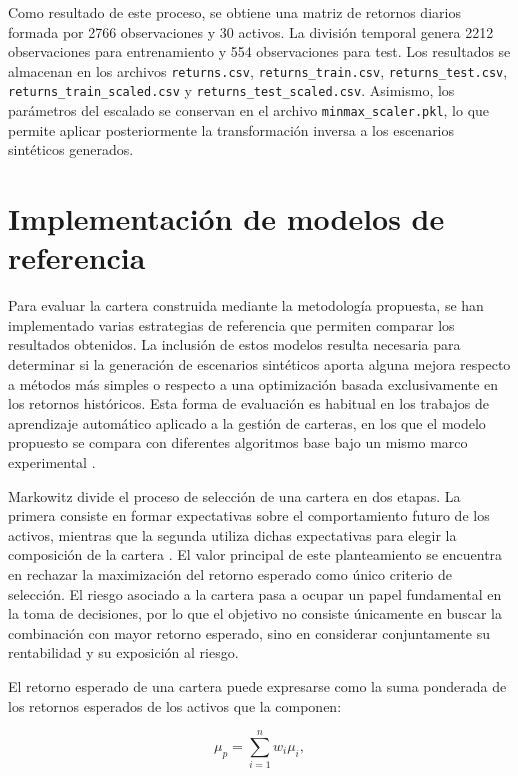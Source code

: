 Como resultado de este proceso, se obtiene una matriz de retornos diarios formada por 2766 observaciones y 30 activos. La división temporal genera 2212 observaciones para entrenamiento y 554 observaciones para test. Los resultados se almacenan en los archivos \texttt{returns.csv}, \texttt{returns\_train.csv}, \texttt{returns\_test.csv}, \texttt{returns\_train\_scaled.csv} y \texttt{returns\_test\_scaled.csv}. Asimismo, los parámetros del escalado se conservan en el archivo \texttt{minmax\_scaler.pkl}, lo que permite aplicar posteriormente la transformación inversa a los escenarios sintéticos generados.

\section{Implementación de modelos de referencia}

Para evaluar la cartera construida mediante la metodología propuesta, se han implementado varias estrategias de referencia que permiten comparar los resultados obtenidos. La inclusión de estos modelos resulta necesaria para determinar si la generación de escenarios sintéticos aporta alguna mejora respecto a métodos más simples o respecto a una optimización basada exclusivamente en los retornos históricos. Esta forma de evaluación es habitual en los trabajos de aprendizaje automático aplicado a la gestión de carteras, en los que el modelo propuesto se compara con diferentes algoritmos base bajo un mismo marco experimental \cite{zhang2020deep}.

Markowitz divide el proceso de selección de una cartera en dos etapas. La primera consiste en formar expectativas sobre el comportamiento futuro de los activos, mientras que la segunda utiliza dichas expectativas para elegir la composición de la cartera \cite{markowitz1952}. El valor principal de este planteamiento se encuentra en rechazar la maximización del retorno esperado como único criterio de selección. El riesgo asociado a la cartera pasa a ocupar un papel fundamental en la toma de decisiones, por lo que el objetivo no consiste únicamente en buscar la combinación con mayor retorno esperado, sino en considerar conjuntamente su rentabilidad y su exposición al riesgo.

El retorno esperado de una cartera puede expresarse como la suma ponderada de los retornos esperados de los activos que la componen:

\begin{equation}
\mu_p = \sum_{i=1}^{n} w_i \mu_i,
\end{equation}

